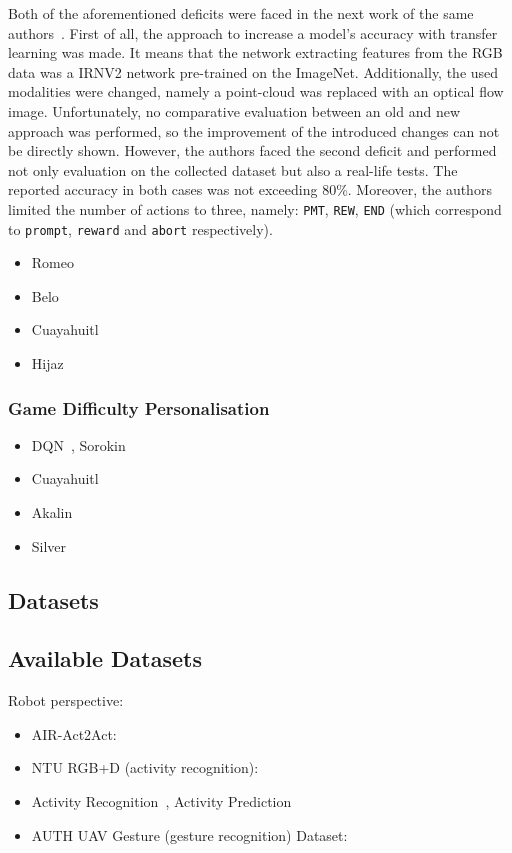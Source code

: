 \documentclass[thesis]{mas_proposal}
\begin{document}
Both of the aforementioned deficits were faced in the next work of the same authors~\cite{Turner2018}. First of all, the approach to increase a model's accuracy with transfer learning was made. It means that the network extracting features from the RGB data was a IRNV2 network pre-trained on the ImageNet. Additionally, the used modalities were changed, namely a point-cloud was replaced with an optical flow image. Unfortunately, no comparative evaluation between an old and new approach was performed, so the improvement of the introduced changes can not be directly shown. However, the authors faced the second deficit and performed not only evaluation on the collected dataset but also a real-life tests. The reported accuracy in both cases was not exceeding 80\%. Moreover, the authors limited the number of actions to three, namely: \texttt{PMT}, \texttt{REW}, \texttt{END} (which correspond to \texttt{prompt}, \texttt{reward} and \texttt{abort} respectively).
\begin{itemize}
	\item Romeo~\cite{Romeo2018,Romeo2019,romeo2021human}
	\item Belo~\cite{Belo2021,Belo2022}
	\item Cuayahuitl~\cite{Cuayahuitl2017}
	\item Hijaz~\cite{Hijaz2021}
\end{itemize}

\subsubsection{Game Difficulty Personalisation}

\begin{itemize}
	\item DQN~\cite{mnih2015human}, Sorokin~\cite{sorokin2015deep}
	\item Cuayahuitl~\cite{Cuayahuitl2020}
	\item Akalin~\cite{Akalin2018}
	\item Silver~\cite{Silver2016}
\end{itemize}

\subsection{Datasets}
\subsection{Available Datasets}

Robot perspective:
\begin{itemize}
	\item AIR-Act2Act: \cite{Ko2021}
	\item NTU RGB+D (activity recognition): \cite{Liu2020,Shahroudy_2016_CVPR}
	\item Activity Recognition~\cite{ryoo2013firstperson}, Activity Prediction~\cite{ryoo2015robot}
	\item AUTH UAV Gesture (gesture recognition) Dataset:~\cite{patrona2021overview,Liu2020,Perera_2018_ECCV_Workshops}
\end{itemize}
\end{document}
